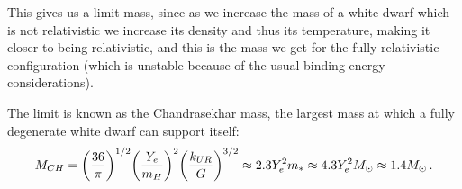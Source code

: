 \documentclass[main.tex]{subfiles}
\begin{document}
This gives us a limit mass, since as we increase the mass of a white dwarf which is not relativistic we increase its density and thus its temperature, making it closer to being relativistic, and this is the mass we get for the fully relativistic configuration (which is unstable because of the usual binding energy considerations).

The limit is known as the Chandrasekhar mass, the largest mass at which a fully degenerate white dwarf can support itself:
%
\begin{align}
  M_{CH} = 
  \qty(\frac{36}{\pi } )^{1/2} \qty(\frac{Y_e}{m_H})^2
  \qty(\frac{k_{UR}}{G})^{3/2} \approx 2.3 Y_e^2 m_{*} \approx 4.3 Y_e^2 M_{\odot} \approx 1.4 M_{\odot}
\,.
\end{align}



\end{document}
